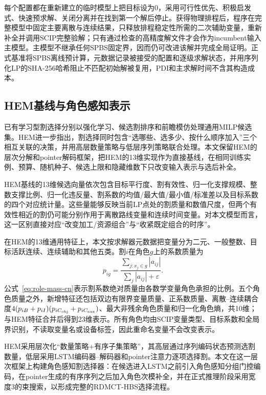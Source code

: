 \documentclass[final,5p,times,twocolumn]{elsarticle}
\begin{document}
每个配置都在重新建立的临时模型上把目标设为0，采用可行性优先、积极启发式、快速预求解、关闭分离并在找到第一个解后停止。获得物理排程后，程序在完整模型中固定主要离散与连续结果，只释放排程稳定性所需的二次辅助变量，重新补全并调用SCIP完整验解；只有通过检查的高精度解文件才会作为incumbent输入主模型。主模型不继承任何SPBS固定界，因而仍可改进该解并完成全局证明。正式基准将SPBS离线预计算，元数据记录被接受的配置和逐级求解状态，并用序列化LP的SHA-256哈希阻止不匹配初始解被复用，PDI和主求解时间不含其构造成本。

\subsection{HEM基线与角色感知表示}

已有学习型割选择分别以强化学习、候选割排序和前瞻模仿处理通用MILP候选集\citep{tang2020cut,huang2022cutranking,paulus2022looking}。HEM进一步指出，割选择同时包含“选哪些、选多少、按什么顺序加入”三个相互关联的决策，并用高层数量策略与低层序列策略联合处理\citep{wang2023hem}。本文保留HEM的层次分解和pointer解码框架，把HEM的13维实现作为直接基线，在相同训练实例、预算、随机种子、候选上限和隐藏维数下只改变输入表示与选后补全。

HEM基线的13维候选向量依次包含目标平行度、割有效性、归一化支撑规模、整数支撑比例、归一化违反量、割系数的均值/最大值/最小值/标准差以及目标系数的四个对应统计量。这些量能够反映当前LP点处的割质量和数值尺度，但两个有效性相近的割仍可能分别作用于离散路线变量和连续时间变量。对本文模型而言，这一区别直接对应“改变加工/资源组合”与“收紧既定组合的时序”。

在HEM的13维通用特征上，本文按求解器元数据把变量分为二元、一般整数、目标活跃连续、连续辅助和其他五类。割$i$在角色$g$上的系数质量为
\begin{equation}
p_{ig}=\frac{\sum_{j:x_j\in g}|a_{ij}|}{\sum_j|a_{ij}|+\varepsilon}.
\label{eq:role-mass-cn}
\end{equation}
公式~\eqref{eq:role-mass-cn}表示割系数绝对质量由各数学变量角色承担的比例。五个角色质量之外，新增特征还包括双边有限界变量质量、正系数质量、离散--连续耦合度$4(p_{iB}+p_{iI})(p_{iC_{\rm obj}}+p_{iC_{\rm aux}})$、最大非残余角色质量和归一化角色熵，共10维；与HEM特征合并后得到23维表示。所有角色均由SCIP变量类型、目标系数和全局界识别，不读取变量名或设备标签，因此重命名变量不会改变表示。

HEM采用层次化“数量策略+有序子集策略”，其高层通过序列编码状态预测选割数量，低层采用LSTM编码器--解码器和pointer注意力逐项选择割\citep{wang2023hem,vinyals2015pointer}。本文在这一层次框架上构建角色感知割选择器：在候选进入LSTM之前引入角色感知分组门控编码，在pointer生成的有序序列之后加入角色次模补全，并在正式推理阶段采用宽度3的束搜索，以形成完整的RDMCT-HBS选择流程。
\end{document}
